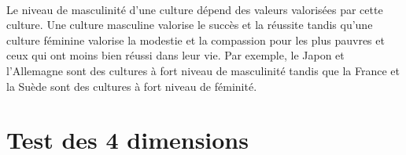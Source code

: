\paragraph{}
Le niveau de masculinité d’une culture dépend des valeurs valorisées par cette culture. Une culture masculine valorise le succès et la réussite tandis qu’une culture féminine valorise la modestie et la compassion pour les plus pauvres et ceux qui ont moins bien réussi dans leur vie. Par exemple, le Japon et l’Allemagne sont des cultures à fort niveau de masculinité tandis que la France et la Suède sont des cultures à fort niveau de féminité. 

\section{Test des 4 dimensions}

